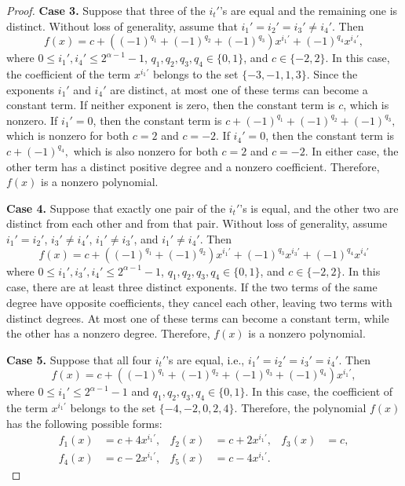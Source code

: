 \documentclass[12pt]{article}
\begin{document}
\begin{proof}
 \medskip

\textbf{Case 3.} Suppose that three of the $i_t'$'s are equal and the remaining one is distinct. Without loss of generality, assume that $i_1'=i_2'=i_3'\neq i_4'$. Then
\[
f(x)=c+\left((-1)^{q_1}+(-1)^{q_2}+(-1)^{q_3}\right)x^{i_1'}
+(-1)^{q_4}x^{i_4'},
\]
where $0\le i_1',i_4'\le2^{\alpha-1}-1$, $q_1,q_2,q_3,q_4\in\{0,1\}$, and $c\in\{-2,2\}$. In this case, the coefficient of the term $x^{i_1'}$ belongs to the set $\{-3,-1,1,3\}$. Since the exponents $i_1'$ and $i_4'$ are distinct, at most one of these terms can become a constant term. If neither exponent is zero, then the constant term is $c$, which is nonzero. If $i_1'=0$, then the constant term is
$
c+(-1)^{q_1}+(-1)^{q_2}+(-1)^{q_3},
$
which is nonzero for both $c=2$ and $c=-2$. If $i_4'=0$, then the constant term is
$
c+(-1)^{q_4},
$
which is also nonzero for both $c=2$ and $c=-2$. In either case, the other term has a distinct positive degree and a nonzero coefficient. Therefore, $f(x)$ is a nonzero polynomial.

 \medskip

\textbf{Case 4.} Suppose that exactly one pair of the $i_t'$'s is equal, and the other two are distinct from each other and from that pair. Without loss of generality, assume $i_1'=i_2'$, $i_3'\neq i_4'$, $i_1'\neq i_3'$, and $i_1'\neq i_4'$. Then
\[
f(x)=c+\left((-1)^{q_1}+(-1)^{q_2}\right)x^{i_1'}
+(-1)^{q_3}x^{i_3'}
+(-1)^{q_4}x^{i_4'}
\]
where $0\le i_1',i_3',i_4'\le2^{\alpha-1}-1$, $q_1,q_2,q_3,q_4\in\{0,1\}$, and $c\in\{-2,2\}$. In this case, there are at least three distinct exponents. If the two terms of the same degree have opposite coefficients, they cancel each other, leaving two terms with distinct degrees. At most one of these terms can become a constant term, while the other has a nonzero degree. Therefore, $f(x)$ is a nonzero polynomial.

 \medskip

\textbf{Case 5.} Suppose that all four $i_t'$'s are equal, i.e., $i_1'=i_2'=i_3'=i_4'$. Then
\[
f(x)=c+\left((-1)^{q_1}+(-1)^{q_2}+(-1)^{q_3}+(-1)^{q_4}\right)x^{i_1'},
\]
where $0\le i_1'\le2^{\alpha-1}-1$ and
$q_1,q_2,q_3,q_4\in\{0,1\}$.
In this case, the coefficient of the term $x^{i_1'}$ belongs to the set
$\{-4,-2,0,2,4\}$. Therefore, the polynomial $f(x)$ has the following possible forms:
\[
\begin{aligned}
	f_1(x)&=c+4x^{i_1'},&
	f_2(x)&=c+2x^{i_1'},&
	f_3(x)&=c,\\
	f_4(x)&=c-2x^{i_1'},&
	f_5(x)&=c-4x^{i_1'}.
\end{aligned}
\]


\end{proof}
\end{document}
